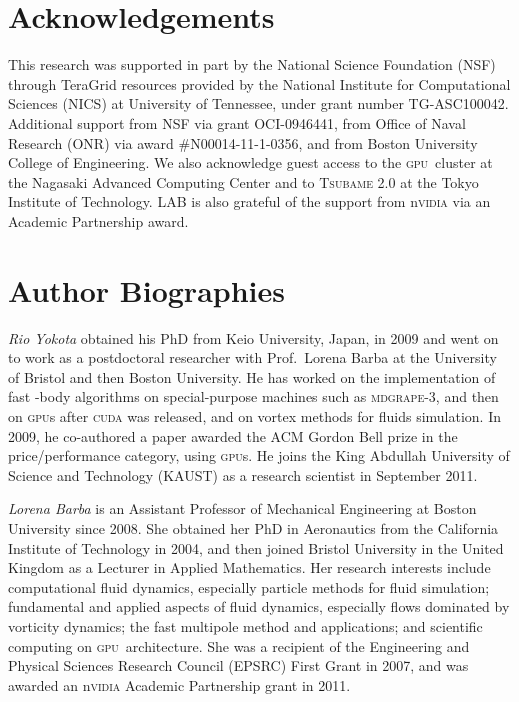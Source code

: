 \documentclass[10pt,twocolumn]{article}
\newcommand{\gpu}{\textsc{gpu}}
\newcommand{\cuda}{\textsc{cuda}\xspace}
\newlength{\up}
\begin{document}
\section*{Acknowledgements}

This research was supported in part by the National Science Foundation (NSF) through TeraGrid resources provided by the National Institute for Computational Sciences (NICS) at University of Tennessee, under grant number TG-ASC100042. Additional support from NSF via grant OCI-0946441, from Office of Naval Research (ONR) via award \#N00014-11-1-0356, and from Boston University College of Engineering.  We also acknowledge guest access to the \gpu\ cluster at the Nagasaki Advanced Computing Center and to \textsc{Tsubame} 2.0 at the Tokyo Institute of Technology. LAB is also grateful of the support from n\textsc{vidia} via an Academic Partnership award.


\section*{Author Biographies}

\emph{Rio Yokota} obtained his PhD from Keio University, Japan, in 2009 and went on to work as a postdoctoral researcher with Prof.\ Lorena Barba at the University of Bristol and then  Boston University.   He has worked on the implementation of fast -body algorithms on special-purpose machines such as \textsc{mdgrape}-3, and then on \gpu s after \cuda was released, and on vortex methods for fluids simulation.  In 2009, he co-authored a paper awarded the ACM Gordon Bell prize in the price/performance category, using \gpu s.  He joins the King Abdullah University of Science and Technology (KAUST) as a research scientist in September 2011.

\bigskip

\noindent\emph{Lorena Barba} is an Assistant Professor of Mechanical Engineering at Boston University since 2008.  She obtained her PhD in Aeronautics from the California Institute of Technology in 2004, and then joined Bristol University in the United Kingdom as a Lecturer in Applied Mathematics.  Her research interests include computational fluid dynamics, especially particle methods for fluid simulation; fundamental and applied aspects of fluid dynamics, especially flows dominated by vorticity dynamics; the fast multipole method and applications; and scientific computing on \gpu\ architecture. She was a recipient of the Engineering and Physical Sciences Research Council (EPSRC) First Grant in 2007, and was awarded an n\textsc{vidia} Academic Partnership grant in 2011.
\end{document}
